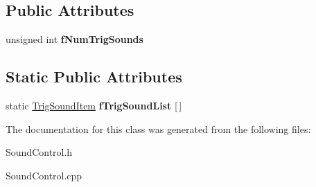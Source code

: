 \subsection*{\-Public \-Attributes}
\begin{DoxyCompactItemize}
\item 
\hypertarget{classSoundControl_ac30f11cd91fc72225d1d7912e566e81e}{unsigned int {\bfseries f\-Num\-Trig\-Sounds}}\label{classSoundControl_ac30f11cd91fc72225d1d7912e566e81e}

\end{DoxyCompactItemize}
\subsection*{\-Static \-Public \-Attributes}
\begin{DoxyCompactItemize}
\item 
\hypertarget{classSoundControl_aca5aba7cd50812e21ad562f5b9069339}{static \hyperlink{structSoundControl_1_1TrigSoundItem}{\-Trig\-Sound\-Item} {\bfseries f\-Trig\-Sound\-List} \mbox{[}$\,$\mbox{]}}\label{classSoundControl_aca5aba7cd50812e21ad562f5b9069339}

\end{DoxyCompactItemize}


\-The documentation for this class was generated from the following files\-:\begin{DoxyCompactItemize}
\item 
\-Sound\-Control.\-h\item 
\-Sound\-Control.\-cpp\end{DoxyCompactItemize}
